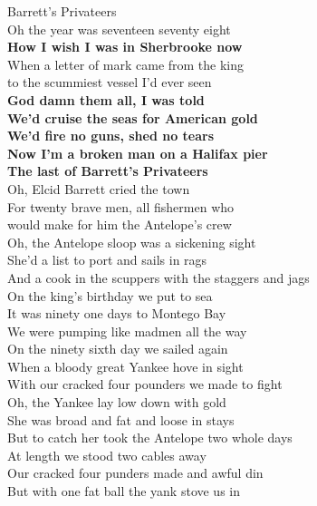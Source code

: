 \documentclass[letterpaper,9pt]{article}
\begin{document}
\newpage
{}
\Huge
Barrett's Privateers\\

\large
Oh the year was seventeen seventy eight \\
\textbf{How I wish I was in Sherbrooke now} \\
When a letter of mark came from the king \\
to the scummiest vessel I'd ever seen \\
\textbf{God damn them all, I was told \\
We'd cruise the seas for American gold \\
We'd fire no guns, shed no tears \\
Now I'm a broken man on a Halifax pier \\
The last of Barrett's Privateers} \\

Oh, Elcid Barrett cried the town \\
For twenty brave men, all fishermen who \\
would make for him the Antelope's crew \\

Oh, the Antelope sloop was a sickening sight \\
She'd a list to port and sails in rags \\
And a cook in the scuppers with the staggers and jags \\

On the king's birthday we put to sea \\
It was ninety one days to Montego Bay \\
We were pumping like madmen all the way \\

On the ninety sixth day we sailed again \\
When a bloody great Yankee hove in sight \\
With our cracked four pounders we made to fight \\

Oh, the Yankee lay low down with gold \\
She was broad and fat and loose in stays \\
But to catch her took the Antelope two whole days \\

At length we stood two cables away \\
Our cracked four punders made and awful din \\
But with one fat ball the yank stove us in \\
\end{document}
